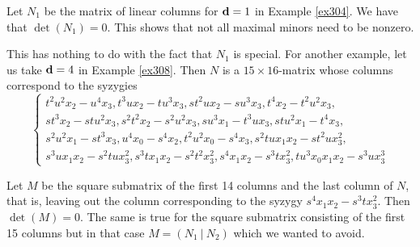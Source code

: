 \documentclass[fleqn,reqno]{amsart}
\numberwithin{first}{chapter}
\begin{document}
\begin{example}[$\mt{ex309}$]
\label{ex309}
Let $N_1$ be the matrix of linear columns for $\mathbf d=1$ in Example \ref{ex304}.
We have that $\det(N_1)=0$. This shows that not all maximal minors need to be nonzero.

This has nothing to do with the fact that $N_1$ is special.
For another example, let us take $\mathbf d=4$ in Example \ref{ex308}.
Then $N$ is a $15\times16$-matrix whose columns correspond to the syzygies
\[
	\begin{cases}
	t^{2} u^{2} {x}_{2}-u^{4} {x}_{3},
	t^{3} u {x}_{2}-t u^{3} {x}_{3},
	s t^{2} u{x}_{2}-s u^{3} {x}_{3},
	t^{4} {x}_{2}-t^{2} u^{2} {x}_{3},\\
	s t^{3} {x}_{2}-s tu^{2} {x}_{3},
	s^{2} t^{2} {x}_{2}-s^{2} u^{2} {x}_{3},
	s u^{3} {x}_{1}-t^{3} u{x}_{3},
	s t u^{2} {x}_{1}-t^{4} {x}_{3},\\
	s^{2} u^{2} {x}_{1}-s t^{3}{x}_{3},
	u^{4} {x}_{0}-s^{4} {x}_{2},
	t^{2} u^{2} {x}_{0}-s^{4} {x}_{3},
	s^{2} t u {x}_{1} {x}_{2}-s t^{2} u {x}_{3}^{2},\\
	s^{3} u {x}_{1} {x}_{2}-s^{2} t u
      {x}_{3}^{2},s^{3} t {x}_{1} {x}_{2}-s^{2} t^{2} {x}_{3}^{2},
	  s^{4} {x}_{1}{x}_{2}-s^{3} t {x}_{3}^{2},
	  t u^{3} {x}_{0} {x}_{1} {x}_{2}-s^{3} u{x}_{3}^{3}
	\end{cases}
\]

Let $M$ be the square submatrix of the first 14 columns and the last column of $N$,
that is,
leaving out the column corresponding to the syzygy $s^{4} {x}_{1}{x}_{2}-s^{3} t {x}_{3}^{2}$.
Then $\det(M)=0$.
The same is true for the square submatrix consisting of the first 15 columns
but in that case $M=(N_1~|~N_2)$ which we wanted to avoid.
\end{example}
\end{document}
